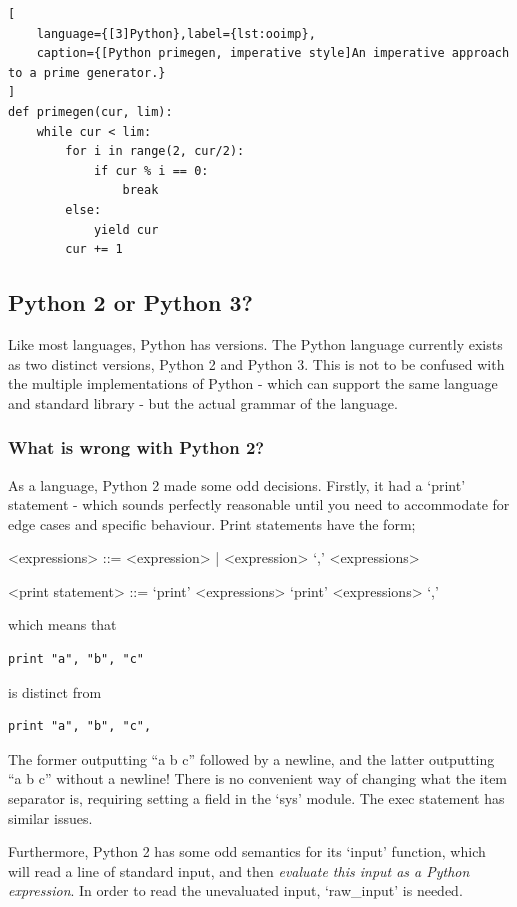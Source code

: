 \documentclass[10pt,a4paper,notitlepage]{report}
\begin{document}
\begin{lstlisting}[
	language={[3]Python},label={lst:ooimp},
	caption={[Python primegen, imperative style]An imperative approach to a prime generator.}
]
def primegen(cur, lim):
    while cur < lim:
        for i in range(2, cur/2):
            if cur % i == 0:
                break
        else:
            yield cur
        cur += 1

\end{lstlisting}

\subsection{Python 2 or Python 3?}
Like most languages, Python has versions. The Python language currently exists as two distinct versions, Python 2 and Python 3. This is not to be confused with the multiple implementations of Python - which can support the same language and standard library - but the actual grammar of the language.

\subsubsection{What is wrong with Python 2?}
As a language, Python 2 made some odd decisions. Firstly, it had a `print' statement - which sounds perfectly reasonable until you need to accommodate for edge cases and specific behaviour. Print statements have the form;
\begin{grammar}
<expressions> ::= <expression> | <expression> `,' <expressions>

<print statement> ::= `print' <expressions>
\alt `print' <expressions> `,'
\end{grammar}

which means that
\begin{lstlisting}[language={[2]Python}]
print "a", "b", "c"
\end{lstlisting}

is distinct from
\begin{lstlisting}[language={[2]Python}]
print "a", "b", "c",
\end{lstlisting}

The former outputting ``a b c'' followed by a newline, and the latter outputting ``a b c'' without a newline! There is no convenient way of changing what the item separator is, requiring setting a field in the `sys' module. The exec statement has similar issues.

Furthermore, Python 2 has some odd semantics for its `input' function, which will read a line of standard input, and then \emph{evaluate this input as a Python expression}. In order to read the unevaluated input, `raw_input' is needed.
\end{document}
